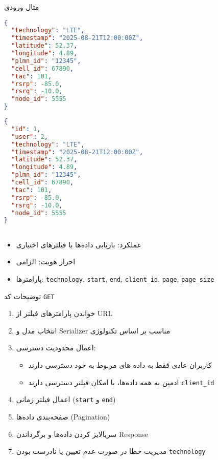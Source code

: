 \documentclass{report}
\begin{document}
مثال ورودی   \texttt{}
\begin{lstlisting}[language=json]
{
  "technology": "LTE",
  "timestamp": "2025-08-21T12:00:00Z",
  "latitude": 52.37,
  "longitude": 4.89,
  "plmn_id": "12345",
  "cell_id": 67890,
  "tac": 101,
  "rsrp": -85.0,
  "rsrq": -10.0,
  "node_id": 5555
}
\end{lstlisting}

\begin{lstlisting}[language=json]
{
  "id": 1,
  "user": 2,
  "technology": "LTE",
  "timestamp": "2025-08-21T12:00:00Z",
  "latitude": 52.37,
  "longitude": 4.89,
  "plmn_id": "12345",
  "cell_id": 67890,
  "tac": 101,
  "rsrp": -85.0,
  "rsrq": -10.0,
  "node_id": 5555
}
\end{lstlisting}



\subsection{}
\begin{itemize}
    \item عملکرد: بازیابی داده‌ها با فیلترهای اختیاری
    \item احراز هویت: الزامی
    \item پارامترها: \texttt{technology}, \texttt{start}, \texttt{end}, \texttt{client\_id}, \texttt{page}, \texttt{page\_size}
\end{itemize}

   توضیحات کد  \texttt{GET}
\begin{enumerate}
    \item خواندن پارامترهای فیلتر از URL
    \item انتخاب مدل و Serializer مناسب بر اساس تکنولوژی
    \item اعمال محدودیت دسترسی:
    \begin{itemize}
        \item کاربران عادی  فقط به داده های مربوط به خود دسترسی دارند  
        \item ادمین به  همه داده‌ها، با امکان فیلتر دسترسی دارند  \texttt{client\_id}
    \end{itemize}
    \item اعمال فیلتر زمانی (\texttt{start} و \texttt{end})
    \item صفحه‌بندی داده‌ها (Pagination)
    \item سریالایز کردن داده‌ها و برگرداندن Response
    \item مدیریت خطا در صورت عدم تعیین یا نادرست بودن \texttt{technology}
\end{enumerate}
\end{document}
